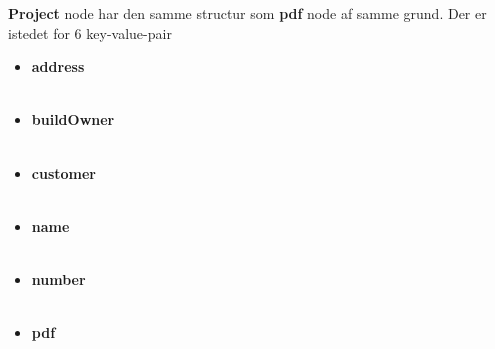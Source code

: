 	\textbf{Project} node har den samme structur som \textbf{pdf} node af samme grund. Der er istedet for 6 key-value-pair
	\begin{itemize}
		\item  \textbf{address}\\
		\\
		\item  \textbf{buildOwner}\\
		\\
		\item  \textbf{customer}\\
		\\
		\item  \textbf{name}\\
		\\
		\item  \textbf{number}\\
		\\
		\item  \textbf{pdf}\\
		\\
	\end{itemize}